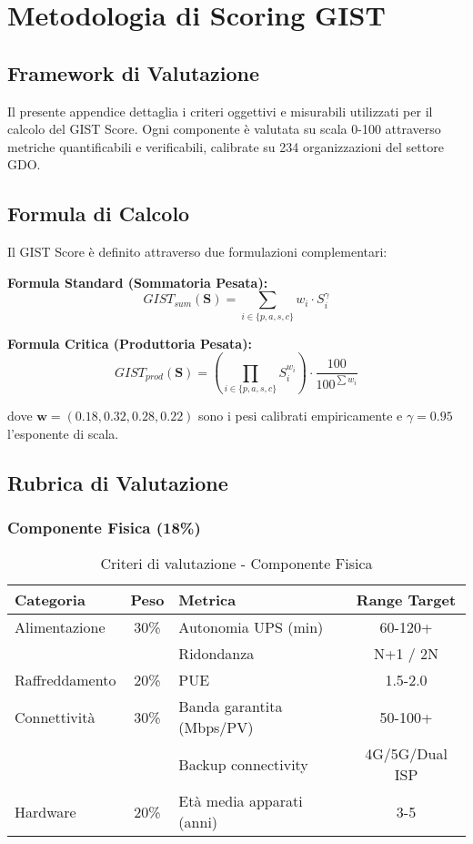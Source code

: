 \chapter{Metodologia di Scoring GIST}
\label{app:scoring}

\section{Framework di Valutazione}

Il presente appendice dettaglia i criteri oggettivi e misurabili utilizzati per il calcolo del GIST Score. Ogni componente è valutata su scala 0-100 attraverso metriche quantificabili e verificabili, calibrate su 234 organizzazioni del settore GDO.

\section{Formula di Calcolo}

Il GIST Score è definito attraverso due formulazioni complementari:

\textbf{Formula Standard (Sommatoria Pesata):}
\begin{equation}
GIST_{sum}(\mathbf{S}) = \sum_{i \in \{p,a,s,c\}} w_i \cdot S_i^{\gamma}
\end{equation}

\textbf{Formula Critica (Produttoria Pesata):}
\begin{equation}
GIST_{prod}(\mathbf{S}) = \left(\prod_{i \in \{p,a,s,c\}} S_i^{w_i}\right) \cdot \frac{100}{100^{\sum w_i}}
\end{equation}

dove $\mathbf{w} = (0.18, 0.32, 0.28, 0.22)$ sono i pesi calibrati empiricamente e $\gamma = 0.95$ l'esponente di scala.

\section{Rubrica di Valutazione}

\subsection{Componente Fisica (18\%)}

\begin{table}[H]
\centering
\caption{Criteri di valutazione - Componente Fisica}
\small
\begin{tabular}{l c l c}
\toprule
\textbf{Categoria} & \textbf{Peso} & \textbf{Metrica} & \textbf{Range Target} \\
\midrule
Alimentazione & 30\% & Autonomia UPS (min) & 60-120+ \\
& & Ridondanza & N+1 / 2N \\
Raffreddamento & 20\% & PUE & 1.5-2.0 \\
Connettività & 30\% & Banda garantita (Mbps/PV) & 50-100+ \\
& & Backup connectivity & 4G/5G/Dual ISP \\
Hardware & 20\% & Età media apparati (anni) & 3-5 \\
\bottomrule
\end{tabular}
\end{table}

